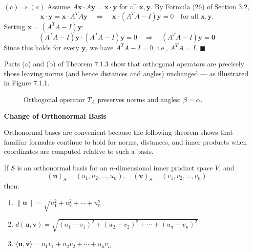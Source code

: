 \documentclass{article}
\newcommand{\redheading}[1]{{\vspace{2mm}\noindent\Large\bfseries\color{red!55!black} #1\par}\vspace{2mm}}
\theoremstyle{mystyle}
\begin{document}
\textbf{$(c)\Rightarrow(a)$} Assume $A\mathbf{x}\cdot A\mathbf{y}=\mathbf{x}\cdot\mathbf{y}$ for all $\mathbf{x},\mathbf{y}$. By Formula (26) of Section 3.2,
\[
  \mathbf{x}\cdot\mathbf{y} = \mathbf{x}\cdot A^T A\mathbf{y}
  \quad\Longrightarrow\quad
  \mathbf{x}\cdot(A^T A-I)\mathbf{y} = 0
  \quad\text{for all } \mathbf{x},\mathbf{y}.
\]
Setting $\mathbf{x}=(A^T A-I)\mathbf{y}$:
\[
  (A^T A-I)\mathbf{y}\cdot(A^T A-I)\mathbf{y} = 0
  \quad\Longrightarrow\quad (A^T A-I)\mathbf{y}=\mathbf{0}
\]
Since this holds for every $\mathbf{y}$, we have $A^T A - I = 0$, i.e., $A^T A = I$. $\blacksquare$

Parts (a) and (b) of Theorem 7.1.3 show that orthogonal operators are precisely those leaving norms (and hence distances and angles) unchanged --- as illustrated in Figure 7.1.1.

\begin{figure}[h]
\centering
{}
\caption{Orthogonal operator $T_A$ preserves norms and angles: $\beta = \alpha$.}
\label{fig:711}
\end{figure}

\redheading{Change of Orthonormal Basis}

Orthonormal bases are convenient because the following theorem shows that familiar formulas
continue to hold for norms, distances, and inner products when coordinates are computed
relative to such a basis.

\begin{tcolorbox}[colback=red!4, colframe=red!60!black,
  title={\textbf{Theorem 7.1.4}}, boxrule=0.5mm, arc=3mm]
If $S$ is an orthonormal basis for an $n$-dimensional inner product space $V$, and
\[
  (\mathbf{u})_S = (u_1,u_2,\ldots,u_n), \quad (\mathbf{v})_S = (v_1,v_2,\ldots,v_n)
\]
then:
\begin{enumerate}
  \item[(a)] $\|\mathbf{u}\| = \sqrt{u_1^2+u_2^2+\cdots+u_n^2}$
  \item[(b)] $d(\mathbf{u},\mathbf{v}) = \sqrt{(u_1-v_1)^2+(u_2-v_2)^2+\cdots+(u_n-v_n)^2}$
  \item[(c)] $\langle\mathbf{u},\mathbf{v}\rangle = u_1v_1+u_2v_2+\cdots+u_nv_n$
\end{enumerate}
\end{tcolorbox}
\end{document}
